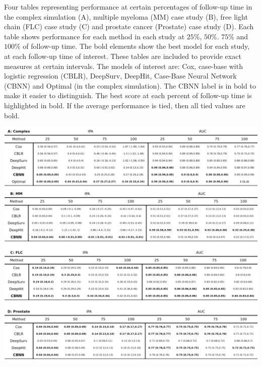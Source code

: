 \documentclass[APA,LATO1COL]{WileyNJD-v2}
\begin{document}
\begin{table}[!htbp]
\caption{Four tables representing performance at certain percentages of follow-up time in the complex simulation (A), multiple myeloma (MM) case study (B), free light chain (FLC) case study (C) and prostate cancer (Prostate) case study (D). Each table shows performance for each method in each study at $25\%$, $50\%$. $75\%$ and $100\%$ of follow-up time. The bold elements show the best model for each study, at each follow-up time of interest. These tables are included to provide exact measures at certain intervals. The models of interest are: Cox, case-base with logistic regression (CBLR), DeepSurv, DeepHit, Case-Base Neural Network (CBNN) and Optimal (in the complex simulation). The CBNN label is in bold to make it easier to distinguish. The best score at each percent of follow-up time is highlighted in bold. If the average performance is tied, then all tied values are bold.}
\label{tab:megaTable}

\begin{center}\includegraphics[width=1\linewidth]{../figures/megaTable} \end{center}

\end{table}

\end{document}
